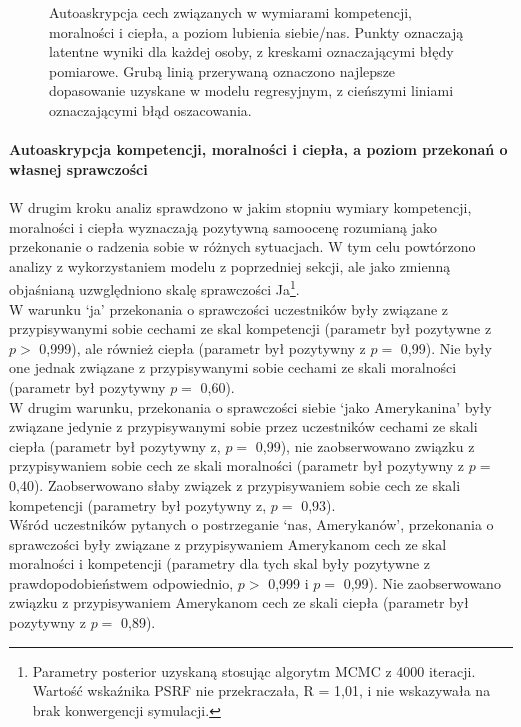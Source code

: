 \documentclass[man]{apa6}
\begin{document}
\begin{figure*}[htbp]
   \centering
   \caption{Autoaskrypcja cech związanych w wymiarami kompetencji, moralności i ciepła, a poziom lubienia siebie/nas. Punkty oznaczają latentne wyniki dla każdej osoby, z kreskami oznaczającymi błędy pomiarowe. Grubą linią przerywaną oznaczono najlepsze dopasowanie uzyskane w modelu regresyjnym, z cieńszymi liniami oznaczającymi błąd oszacowania.}
   \label{fig:study2a}
\end{figure*}


\paragraph{Autoaskrypcja kompetencji, moralności i ciepła, a poziom przekonań o własnej sprawczości}
W drugim kroku analiz sprawdzono w jakim stopniu wymiary kompetencji, moralności i ciepła wyznaczają pozytywną samoocenę rozumianą jako przekonanie o radzenia sobie w różnych sytuacjach. W tym celu powtórzono analizy z wykorzystaniem modelu z poprzedniej sekcji, ale jako zmienną objaśnianą uzwględniono skalę sprawczości Ja\footnote{Parametry posterior uzyskaną stosując algorytm MCMC z 4000 iteracji. Wartość wskaźnika PSRF nie przekraczała, R = 1,01, i nie wskazywała na brak konwergencji symulacji.}. \\

W warunku `ja' przekonania o sprawczości uczestników były związane z przypisywanymi sobie cechami ze skal kompetencji (parametr był pozytywne z $p >$ 0,999), ale również ciepła (parametr był pozytywny z $p =$ 0,99). Nie były one jednak związane z przypisywanymi sobie cechami ze skali moralności (parametr był pozytywny $p =$ 0,60). \\

W drugim warunku, przekonania o sprawczości siebie `jako Amerykanina' były związane jedynie z przypisywanymi sobie przez uczestników cechami ze skali ciepła (parametr był pozytywny z, $p =$ 0,99), nie zaobserwowano związku z przypisywaniem sobie cech ze skali moralności (parametr był pozytywny z $p =$ 0,40). Zaobserwowano słaby związek z przypisywaniem sobie cech ze skali kompetencji (parametry był pozytywny z, $p =$ 0,93).\\

Wśród uczestników pytanych o postrzeganie `nas, Amerykanów', przekonania o sprawczości były związane z przypisywaniem Amerykanom cech ze skal moralności i kompetencji (parametry dla tych skal były pozytywne z prawdopodobieństwem odpowiednio, $p >$ 0,999 i $p =$ 0,99). Nie zaobserwowano związku z przypisywaniem Amerykanom cech ze skali ciepła (parametr był pozytywny z $p =$ 0,89). \\
\end{document}
